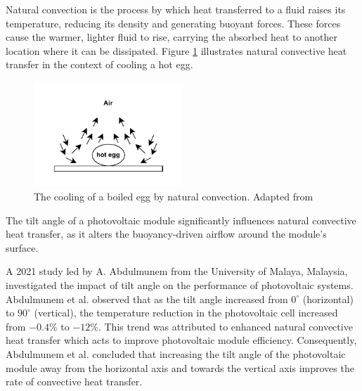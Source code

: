 Natural convection is the process by which heat transferred to a fluid raises its temperature, reducing its density and generating buoyant forces. These forces cause the warmer, lighter fluid to rise, carrying the absorbed heat to another location where it can be dissipated. \cite{Zohuri2020ThermosyphonApplications} Figure \ref{fig:cooling_of_boiled_egg_natural_convection} illustrates natural convective heat transfer in the context of cooling a hot egg.

\begin{figure}[ht]
    \centering
    \includegraphics[width=0.5\textwidth, trim=0 10 0 15, clip]{Figures/cooling_of_boiled_egg_natural_convection.pdf}
    \caption{The cooling of a boiled egg by natural convection. Adapted from \cite{Cengel2014IntroductionConcepts}}
    \label{fig:cooling_of_boiled_egg_natural_convection}
\end{figure}

The tilt angle of a photovoltaic module significantly influences natural convective heat transfer, as it alters the buoyancy-driven airflow around the module’s surface.\vspace{0.5em}


A 2021 study led by A. Abdulmunem from the University of Malaya, Malaysia, investigated the impact of tilt angle on the performance of photovoltaic systems. Abdulmunem et al. observed that as the tilt angle increased from $0^\circ$ (horizontal) to $90^\circ$ (vertical), the temperature reduction in the photovoltaic cell increased from $-0.4\%$ to $-12\%$. This trend was attributed to enhanced natural convective heat transfer which acts to improve photovoltaic module efficiency. Consequently, Abdulmunem et al. concluded that increasing the tilt angle of the photovoltaic module away from the horizontal axis and towards the vertical axis improves the rate of convective heat transfer. \cite{Abdulmunem2021NumericalSink}\vspace{0.5em}

